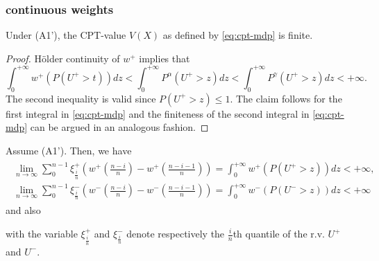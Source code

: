 \subsubsection{\holder continuous weights}
\label{sec:holder-proofs}
\begin{proposition}
\label{prop:Holder-cpt-finite}
Under (A1'), the CPT-value $V(X)$ as defined by \eqref{eq:cpt-mdp} is finite. 
\end{proposition}
\begin{proof}

H\"{o}lder continuity of $w^+$ implies that 
$$
\int_0^{+\infty} w^+(P(U^+>t)) dz 
< \int_0^{+\infty} P^{\alpha} (U^+>z) dz
< \int_0^{+\infty} P^{\gamma} (U^+>z) dz 
<+\infty.
$$
The second inequality is valid since $P(U^+>z) \leq 1$. The claim follows for the first integral in \eqref{eq:cpt-mdp} and the finiteness of the second integral in \eqref{eq:cpt-mdp} can be argued in an analogous fashion.
\end{proof}

\begin{proposition}
\label{prop:holder-quantile}
Assume (A1'). Then, we have 
\begin{align}
\label{eq:simple-estimation}
\begin{split}
\lim_{n \rightarrow \infty} \sum_0^{n-1} \xi^+_{\frac{i}{n}} (w^+(\frac{n-i}{n})- w^+(\frac{n-i-1}{n}) ) = \int_0^{+\infty} w^+(P(U^+>z)) dz < +\infty,
\\
\lim_{n \rightarrow \infty} \sum_0^{n-1} \xi^-_{\frac{i}{n}} (w^-(\frac{n-i}{n})- w^-(\frac{n-i-1}{n}) ) = \int_0^{+\infty} w^-(P(U^->z)) dz < +\infty
\end{split}
\end{align}
and also

with the variable $\xi^+_{\frac{i}{n}}$ and $\xi^-_{\frac{i}{n}}$ denote respectively the $\frac{i}{n}$th quantile of the 
r.v. $U^+$ and $U^-$.
\end{proposition}

